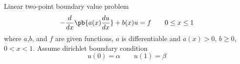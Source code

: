 \documentclass[11pt]{article}
\begin{document}
 

\section{}
\subsection{}

\begin{definition*}
     Linear two-point boundary value problem
    \[
        -\frac{d}{dx} \pb{a(x) \frac{du}{dx}} + b(x)u = f
        \quad \quad 0\leq x\leq 1
    \]
    where $a$,$b$, and $f$ are given functions, $a$ is differentiable and $a(x) > 0$, $b\geq 0$, $0<x<1$. Assume dirichlet boundary condition 
    \[
        u(0) = \alpha \quad \quad u(1) = \beta   
    \]
\end{definition*}
\end{document}
